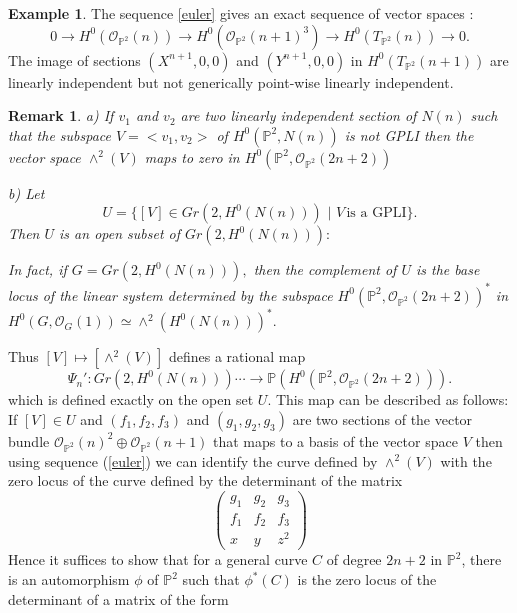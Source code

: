 \documentclass[11pt]{amsart}
\newtheorem{rem}[subsection]{Remark}
\theoremstyle{definition}
\newtheorem{exam}[subsection]{Example}
\newcommand{\OOO}{{\mathcal O}}
\begin{document}
 \begin{exam} The sequence \eqref{euler} gives an exact sequence of vector spaces :
 $$ 0 \to H^0({\mathcal O}_{\mathbb{P}^2}(n) ) \to H^0({\mathcal O}_{\mathbb{P}^2} (n+1)^3) \to H^0(T_{\mathbb{P}^2}(n) )\to 0.$$
 The image of sections $(X^{n+1},0,0)$ and $(Y^{n+1},0,0)$  in  $ H^0(T_{\mathbb{P}^2}(n+1) )$ are linearly independent 
 but not generically point-wise linearly independent.
 \end{exam} 
 
 \begin{rem}
 a)  If $v_1$ and $v_2$ are two linearly independent section of $N(n)$ such that the subspace $V = <v_1,v_2>$ 
 of $H^0(\mathbb{P}^2, N(n))$  is {\em not} GPLI
then the  vector space  $\wedge^2(V)$ maps to zero in $H^0(\mathbb{P}^2, \OOO_{\mathbb{P}^2}(2n+2))$

b) Let 
$$U = \{  [V] \in Gr(2, H^0(N(n))) \,\, | \,\, V  \, \text{is a GPLI} \} .$$ 
Then $U$ is an open  subset of  $Gr(2, H^0(N(n))) :$ 

In fact, if $G = Gr(2, H^0(N(n))),$ then the complement of $U$ is the base locus of the linear system determined by the subspace $H^0(\mathbb{P}^2, \mathcal{O}_{\mathbb{P}^2}(2n+2))^*$ 
in  $H^0(G, \mathcal{O}_G(1))\simeq \wedge^2(H^0(N(n)))^*.$
\end{rem}

Thus $[V] \mapsto [\wedge^2(V)]$ defines a rational map 
\[ \Psi_n' : Gr(2, H^0(N(n))) \cdots\to \mathbb{P}(H^0(\mathbb{P}^2, \OOO_{\mathbb{P}^2}(2n+2))). \]
which is defined exactly on the open set $U.$ This map can be described as follows:
If $[V] \in U$ and $(f_1,f_2,f_3)$ and $(g_1,g_2,g_3)$ are two sections of the 
vector bundle ${\mathcal O}_{\mathbb{P}^2}(n)^2\oplus{\mathcal O}_{\mathbb{P}^2}(n+1) $ that maps to a basis of the vector
space $V$ then using sequence (\ref{euler}) we can identify the curve defined by 
$\wedge^2(V)$ with the zero locus of the curve defined by the determinant of the matrix
\[ \begin{pmatrix}
g_1 & g_2 & g_3\\
f_1 & f_2 & f_3\\
x & y & z^2
\end{pmatrix}
\]
Hence it suffices to show that for a general curve $C$ of degree $2n+2$ in $\mathbb{P}^2$, there is an automorphism $\phi$ of $\mathbb{P}^2$ such that $\phi^*(C)$ is the zero locus of the 
 determinant of a matrix of the form 
\end{document}
